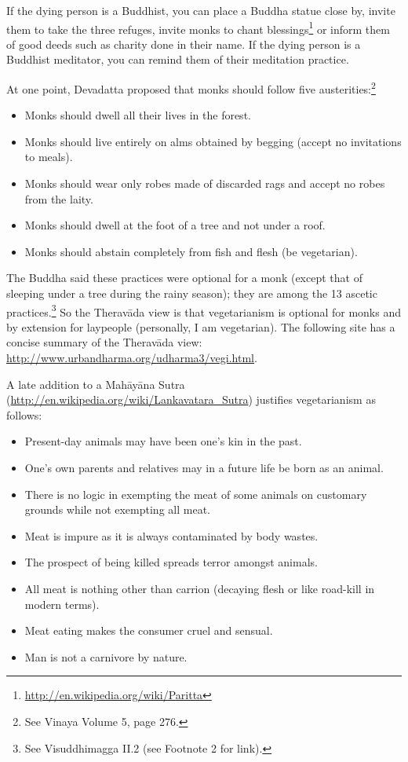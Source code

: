 If the dying person is a Buddhist, you can place a Buddha statue close by, invite them to take the three refuges, invite monks to chant blessings\footnote{\url{ http://en.wikipedia.org/wiki/Paritta}} or inform them of good deeds such as charity done in their name. If the dying person is a Buddhist meditator, you can remind them of their meditation  practice.

\pagebreak


At one point, Devadatta proposed that monks should follow five austerities:\footnote{See Vinaya Volume 5, page 276.}

\begin{itemize}
\item Monks should dwell all their lives in the forest.
\item Monks should live entirely on alms obtained by begging (accept no invitations to meals).
\item Monks should wear only robes made of discarded rags and accept no robes from the laity.
\item Monks should dwell at the foot of a tree and not under a roof.
\item Monks should abstain completely from fish and flesh (be vegetarian).
\end{itemize}

The Buddha said these practices were optional for a monk (except that of sleeping under a tree during the rainy season); they are among the 13 ascetic practices.\footnote{See Visuddhimagga II.2 (see Footnote 2 for link).} So the Theravāda view is that vegetarianism is optional for monks and by extension for laypeople (personally, I am vegetarian). The following site has a concise summary of the Theravāda view: \url{http://www.urbandharma.org/udharma3/vegi.html}. 

A late addition to a Mahāyāna Sutra (\url{http://en.wikipedia.org/wiki/Lankavatara_Sutra}) justifies vegetarianism as follows:

\begin{itemize}
\item Present-day animals may have been one’s kin in the past.
\item One’s own parents and relatives may in a future life be born as an animal.
\item There is no logic in exempting the meat of some animals on customary grounds while not exempting all meat.
\item Meat is impure as it is always contaminated by body wastes.
\item The prospect of being killed spreads terror amongst animals.
\item All meat is nothing other than carrion (decaying flesh or like road-kill in modern terms).
\item Meat eating makes the consumer cruel and sensual.
\item Man is not a carnivore by nature.
\end{itemize}

